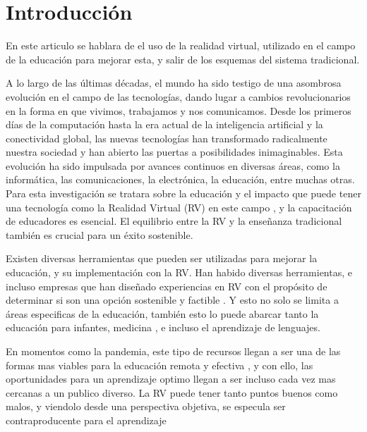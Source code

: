 \section{Introducción}

En este articulo se hablara de el uso de la realidad virtual, utilizado en el campo de la educación para mejorar esta, y salir de los esquemas del sistema tradicional.

A lo largo de las últimas décadas, el mundo ha sido testigo de una asombrosa evolución en el campo de las tecnologías, dando lugar a cambios revolucionarios en la forma en que vivimos, trabajamos y nos comunicamos. Desde los primeros días de la computación hasta la era actual de la inteligencia artificial y la conectividad global, las nuevas tecnologías han transformado radicalmente nuestra sociedad y han abierto las puertas a posibilidades inimaginables. Esta evolución ha sido impulsada por avances continuos en diversas áreas, como la informática, las comunicaciones, la electrónica, la educación, entre muchas otras. Para esta investigación se tratara sobre la educación y el impacto que puede tener una tecnología como la Realidad Virtual (RV) en este campo \cite{garcia2020}, y la capacitación de educadores es esencial. El equilibrio entre la RV y la enseñanza tradicional también es crucial para un éxito sostenible.

Existen diversas herramientas que pueden ser utilizadas para mejorar la educación, y su implementación con la RV. Han habido diversas herramientas, e incluso empresas que han diseñado experiencias en RV con el propósito de determinar si son una opción sostenible y factible \parencite{SHIM2023100010}. Y esto no solo se limita a áreas especificas de la educación, también esto lo puede abarcar tanto la educación para infantes, medicina \parencite{GUERRERO2022100002}, e incluso el aprendizaje de lenguajes. \parencite{YUDINTSEVA2023100018, ZAMMIT2023100035}

En momentos como la pandemia, este tipo de recursos llegan a ser una de las formas mas viables para la educación remota y efectiva \parencite{GUERRERO2022100002}, y con ello, las oportunidades para un aprendizaje optimo llegan a ser incluso cada vez mas cercanas a un publico diverso. La RV puede tener tanto puntos buenos como malos, y viendolo desde una perspectiva objetiva, se especula ser contraproducente para el aprendizaje \parencite{OJE2023100033}




